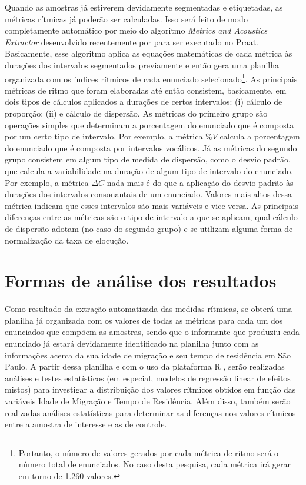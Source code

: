\documentclass[
	a4paper,	%
	12pt,		%
	]{article}	%
\begin{document}
Quando as amostras já estiverem devidamente segmentadas e etiquetadas, as
métricas rítmicas já poderão ser calculadas. Isso será feito de modo
completamente automático por meio do algoritmo \emph{Metrics and Acoustics
	Extractor} desenvolvido recentemente por \citet{SilvaJr.Barbosa2019} para ser
executado no Praat. Basicamente, esse algoritmo aplica as equações matemáticas
de cada métrica às durações dos intervalos segmentados previamente e então gera
uma planilha organizada com os índices rítmicos de cada enunciado
selecionado\footnote{Portanto, o número de valores gerados por cada métrica de
	ritmo será o número total de enunciados. No caso desta pesquisa, cada
	métrica irá gerar em torno de 1.260 valores.}.  As principais métricas de
ritmo que foram elaboradas até então consistem, basicamente, em dois tipos de
cálculos aplicados a durações de certos intervalos: (i) cálculo de proporção;
(ii) e cálculo de dispersão. As métricas do primeiro grupo são operações simples
que determinam a porcentagem do enunciado que é composta por um certo tipo de
intervalo. Por exemplo, a métrica $\%V$ \citep{Ramus.etal1999} calcula a
porcentagem do enunciado que é composta por intervalos vocálicos. Já as métricas
do segundo grupo consistem em algum tipo de medida de dispersão, como o desvio
padrão, que calcula a variabilidade na duração de algum tipo de intervalo do
enunciado. Por exemplo, a métrica $\Delta C$ \citep{Ramus.etal1999} nada mais é
do que a aplicação do desvio padrão às durações dos intervalos consonantais de
um enunciado. Valores mais altos dessa métrica indicam que esses intervalos são
mais variáveis e vice-versa. As principais diferenças entre as métricas são o
tipo de intervalo a que se aplicam, qual cálculo de dispersão adotam (no caso do
segundo grupo) e se utilizam alguma forma de normalização da taxa de elocução.

\section{Formas de análise dos resultados} \label{analise}

Como resultado da extração automatizada das medidas rítmicas, se obterá uma
planilha já organizada com os valores de todas as métricas para cada um dos
enunciados que compõem as amostras, sendo que o informante que produziu cada
enunciado já estará devidamente identificado na planilha junto com as
informações acerca da sua idade de migração e seu tempo de residência em São
Paulo. A partir dessa planilha e com o uso da plataforma R
\citep{RCoreTeam2019}, serão realizadas análises e testes estatísticos (em
especial, modelos de regressão linear de efeitos mistos) para investigar a
distribuição dos valores rítmicos obtidos em função das variáveis Idade de
Migração e Tempo de Residência. Além disso, também serão realizadas análises
estatísticas para determinar as diferenças nos valores rítmicos entre a amostra
de interesse e as de controle. 
	
{ %
	\printbibliography
}
\end{document}
